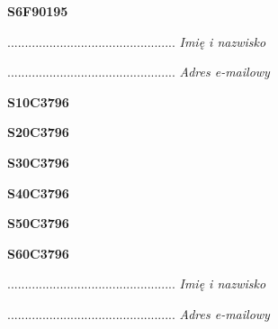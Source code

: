 \begin{turn}{90}\huge \textbf{S6F90195}\end{turn}

\begin{turn}{90}\begin{minipage}{\linewidth} \vspace{20mm} ................................................  \textit{Imię i nazwisko}\end{minipage}\end{turn}

\begin{turn}{90}\begin{minipage}{\linewidth} \vspace{20mm} ................................................  \textit{Adres e-mailowy}\end{minipage}\end{turn}

\begin{turn}{90}\huge \textbf{S10C3796}\end{turn}

\begin{turn}{90}\huge \textbf{S20C3796}\end{turn}

\begin{turn}{90}\huge \textbf{S30C3796}\end{turn}

\begin{turn}{90}\huge \textbf{S40C3796}\end{turn}

\begin{turn}{90}\huge \textbf{S50C3796}\end{turn}

\begin{turn}{90}\huge \textbf{S60C3796}\end{turn}

\begin{turn}{90}\begin{minipage}{\linewidth} \vspace{20mm} ................................................  \textit{Imię i nazwisko}\end{minipage}\end{turn}

\begin{turn}{90}\begin{minipage}{\linewidth} \vspace{20mm} ................................................  \textit{Adres e-mailowy}\end{minipage}\end{turn}

